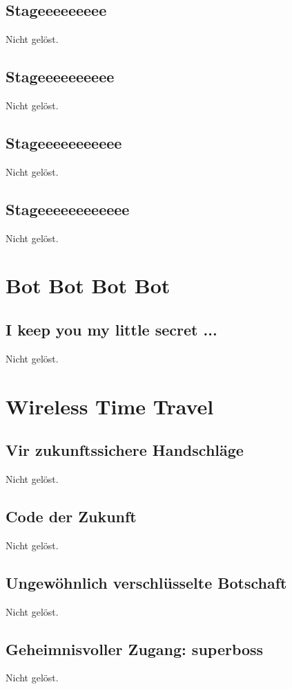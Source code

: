 \documentclass[12pt,a4paper,titlepage,oneside]{scrartcl}
\begin{document}
\subsection{Stageeeeeeeee}
Nicht gelöst.

\subsection{Stageeeeeeeeee}
Nicht gelöst.

\subsection{Stageeeeeeeeeee}
Nicht gelöst.

\subsection{Stageeeeeeeeeeee}
Nicht gelöst.


\section{Bot Bot Bot Bot}

\subsection{I keep you my little secret ...}
Nicht gelöst.


\section{Wireless Time Travel}

\subsection{Vir zukunftssichere Handschl\"age}
Nicht gelöst.

\subsection{Code der Zukunft}
Nicht gelöst.

\subsection{Ungew\"ohnlich verschl\"usselte Botschaft}
Nicht gelöst.

\subsection{Geheimnisvoller Zugang: superboss}
Nicht gelöst.
\end{document}
